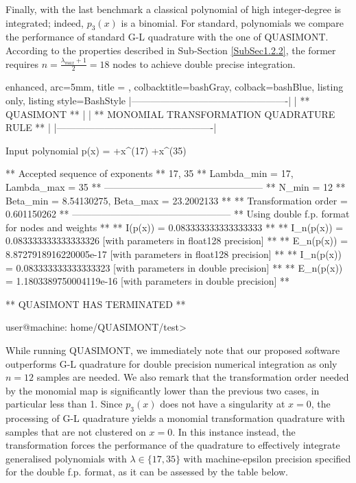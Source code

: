 \documentclass[a4paper, twosided]{book}
\begin{document}
\noindent
Finally, with the last benchmark a classical polynomial of high integer-degree is integrated; indeed, $p_3(x)$ is a binomial. For standard, polynomials we compare the performance of standard  G-L quadrature with the one of QUASIMONT. According to the properties described in Sub-Section \ref{SubSec1.2.2}, the former requires $n=\frac{\lambda_{max}+1}{2}=18$ nodes to achieve double precise integration.

\vspace{0.5cm}
\begin{tcblisting}{enhanced,
                   arc=5mm,
                   title = \color{black}{\large \ttfamily Building and executing the test driver: p\_3(x)},
                   colbacktitle=bashGray,
                   colback=bashBlue,
                   listing only,
                   listing style=BashStyle}           
    |-------------------------------------------------|
    |                 ** QUASIMONT **                 |
    |  ** MONOMIAL TRANSFORMATION QUADRATURE RULE **  |
    |-------------------------------------------------|
    
Input polynomial p(x) =  +x^(17)  +x^(35) 

 ** Accepted sequence of exponents ** 
    {17, 35}
 ** Lambda_min = 17, Lambda_max = 35 **
 --------------------------------------------------
 ** N_min = 12
 ** Beta_min = 8.54130275, Beta_max = 23.2002133 **
 ** Transformation order = 0.601150262 **
 --------------------------------------------------
 ** Using double f.p. format for nodes and weights **
 ** I(p(x))   = 0.083333333333333333 **
 ** I_n(p(x)) = 0.083333333333333326    [with parameters in float128 precision] **
 ** E_n(p(x)) = 8.8727918916220005e-17  [with parameters in float128 precision] **
 ** I_n(p(x)) = 0.083333333333333323    [with parameters in double precision] **
 ** E_n(p(x)) = 1.1803389750004119e-16  [with parameters in double precision] **

 ** QUASIMONT HAS TERMINATED **

user@machine: home/QUASIMONT/test>
\end{tcblisting}
\vspace{0.5cm}

\noindent
While running QUASIMONT, we immediately note that our proposed software outperforms G-L quadrature for double precision numerical integration as only $n=12$ samples are needed. We also remark  that the transformation order needed by the monomial map is significantly lower than the previous two cases, in particular less than 1. Since $p_3(x)$ does not have a singularity at $x=0$, the processing of G-L quadrature yields a monomial transformation quadrature with samples that are not clustered on $x=0$. In this instance instead, the transformation forces the performance of the quadrature to effectively integrate generalised polynomials with $\lambda\in\{17,35\}$ with machine-epsilon precision specified for the double f.p. format, as it can be assessed by the table below.
\end{document}
